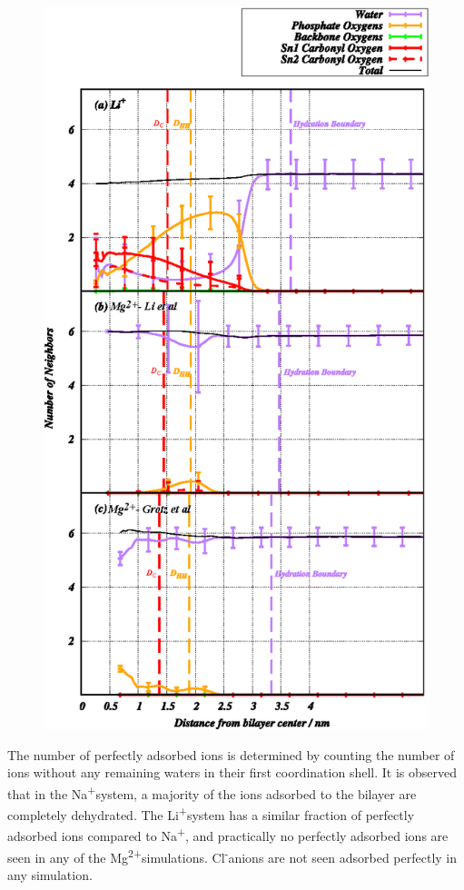\documentclass[12pt,openany,final]{book}
\newcommand{\na}{Na\textsuperscript{+}}
\newcommand{\li}{Li\textsuperscript{+}}
\newcommand{\mg}{Mg\textsuperscript{2+}}
\newcommand{\cl}{Cl\textsuperscript{-}}
\begin{document}
\begin{figure}
    \includegraphics[height=0.7\textheight]{Figure_7_ch2.eps}
\end{figure}

The number of perfectly adsorbed ions is determined by counting the number of ions without any remaining 
waters in their first coordination shell. It is observed that in the \na system, a 
majority of the ions adsorbed to the bilayer are completely dehydrated. %
The \li system has a similar fraction of perfectly adsorbed ions compared to Na\textsuperscript{+}, 
and practically no perfectly adsorbed 
ions are seen in any of the \mg simulations. \cl anions are not seen adsorbed perfectly in any simulation.
\end{document}
